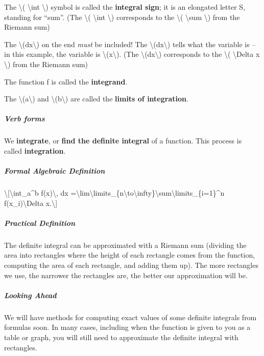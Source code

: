 The \textbackslash{}( \textbackslash{}int \textbackslash{}) symbol is
called the \textbf{integral sign}; it is an elongated letter S, standing
for ``sum''. (The \textbackslash{}( \textbackslash{}int
\textbackslash{}) corresponds to the \textbackslash{}(
\textbackslash{}sum \textbackslash{}) from the Riemann sum)

The \textbackslash{}(dx\textbackslash{}) on the end \emph{must} be
included! The \textbackslash{}(dx\textbackslash{}) tells what the
variable is -- in this example, the variable is
\textbackslash{}(x\textbackslash{}). (The
\textbackslash{}(dx\textbackslash{}) corresponds to the
\textbackslash{}( \textbackslash{}Delta x \textbackslash{}) from the
Riemann sum)

The function f is called the \textbf{integrand}.

The \textbackslash{}(a\textbackslash{}) and
\textbackslash{}(b\textbackslash{}) are called the \textbf{limits of
integration}.

\hypertarget{verb-forms}{%
\subparagraph{Verb forms}\label{verb-forms}}

We \textbf{integrate}, or \textbf{find the definite integral} of a
function. This process is called \textbf{integration}.

\hypertarget{formal-algebraic-definition}{%
\subparagraph{Formal Algebraic
Definition}\label{formal-algebraic-definition}}

\textbackslash{}{[}\textbackslash{}int\_a\^{}b f(x)\textbackslash{}, dx
=\textbackslash{}lim\textbackslash{}limits\_\{n\textbackslash{}to\textbackslash{}infty\}\textbackslash{}sum\textbackslash{}limits\_\{i=1\}\^{}n
f(x\_i)\textbackslash{}Delta x.\textbackslash{}{]}

\hypertarget{practical-definition}{%
\subparagraph{Practical Definition}\label{practical-definition}}

The definite integral can be approximated with a Riemann sum (dividing
the area into rectangles where the height of each rectangle comes from
the function, computing the area of each rectangle, and adding them up).
The more rectangles we use, the narrower the rectangles are, the better
our approximation will be.

\hypertarget{looking-ahead}{%
\subparagraph{Looking Ahead}\label{looking-ahead}}

We will have methods for computing exact values of some definite
integrals from formulas soon. In many cases, including when the function
is given to you as a table or graph, you will still need to approximate
the definite integral with rectangles.

